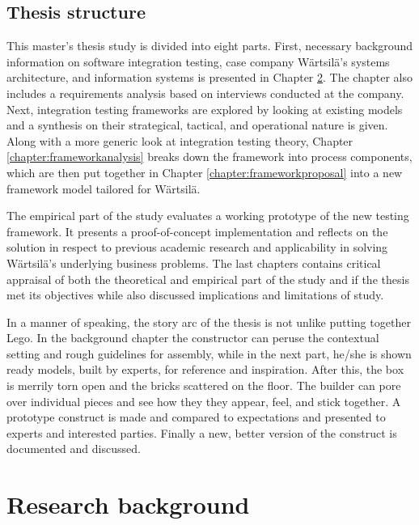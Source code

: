 \documentclass[12pt,a4paper,oneside,pdftex]{report}
\begin{document}

\section{Thesis structure}
\label{section:structure}

This master's thesis study is divided into eight parts. First, necessary background information on software integration testing, case company Wärtsilä's systems architecture, and information systems is presented in Chapter \ref{chapter:background}. The chapter also includes a requirements analysis based on interviews conducted at the company. Next, integration testing frameworks are explored by looking at existing models and a synthesis on their strategical, tactical, and operational nature is given. Along with a more generic look at integration testing theory, Chapter \ref{chapter:frameworkanalysis} breaks down the framework into process components, which are then put together in Chapter \ref{chapter:frameworkproposal} into a new framework model tailored for Wärtsilä.

The empirical part of the study evaluates a working prototype of the new testing framework. It presents a proof-of-concept implementation and reflects on the solution in respect to previous academic research and applicability in solving Wärtsilä's underlying business problems. The last chapters contains critical appraisal of both the theoretical and empirical part of the study and if the thesis met its objectives while also discussed implications and limitations of study.


In a manner of speaking, the story arc of the thesis is not unlike putting together Lego. In the background chapter the constructor can peruse the contextual setting and rough guidelines for assembly, while in the next part, he/she is shown ready models, built by experts, for reference and inspiration. After this, the box is merrily torn open and the bricks scattered on the floor. The builder can pore over individual pieces and see how they they appear, feel, and stick together. A prototype construct is made and compared to expectations and presented to experts and interested parties. Finally a new, better version of the construct is documented and discussed.

\chapter{Research background}
\label{chapter:background}
\end{document}
